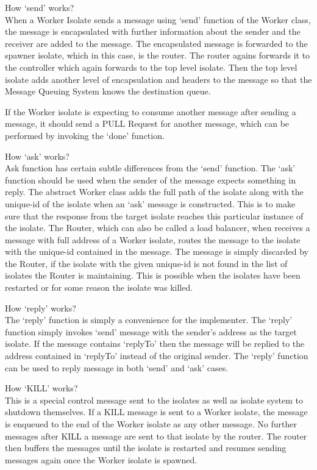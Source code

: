   \begin{description}
    \item How ‘send’ works?\\
      When a Worker Isolate sends a message using ‘send’ function of the Worker class, the message is encapsulated with further information about the sender and the receiver are added to the message. The encapsulated message is forwarded to the spawner isolate, which in this case, is the router. The router agains forwards it to the controller which again forwards to the top level isolate. Then the top level isolate adds another level of encapsulation and headers to the message so that the Message Queuing System knows the destination queue.

      If the Worker isolate is expecting to consume another message after sending a message, it should send a PULL Request for another message, which can be performed by invoking the ‘done’ function.

      \item How ‘ask’ works?\\
    Ask function has certain subtle differences from the ‘send’ function. The ‘ask’ function should be used when the sender of the message expects something in reply. The abstract Worker class adds the full path of the isolate along with the unique-id of the isolate when an ‘ask’ message is constructed. This is to make sure that the response from the target isolate reaches this particular instance of the isolate. The Router, which can also be called a load balancer, when receives a message with full address of a Worker isolate, routes the message to the isolate with the unique-id contained in the message. The message is simply discarded by the Router, if the isolate with the given unique-id is not found in the list of isolates the Router is maintaining. This is possible when the isolates have been restarted or for some reason the isolate was killed.

    \item How ‘reply’ works?\\
    The ‘reply’ function is simply a convenience for the implementer. The ‘reply’ function simply invokes ‘send’ message with the sender’s address as the target isolate. If the message contains ‘replyTo’ then the message will be replied to the address contained in ‘replyTo’ instead of the original sender. The ‘reply’ function can be used to reply message in both \textendash{} ‘send’ and ‘ask’ cases.

    \item How ‘KILL’ works?\\
    This is a special control message sent to the isolates as well as isolate system to shutdown themselves. If a KILL message is sent to a Worker isolate, the message is enqueued to the end of the Worker isolate as any other message. No further messages after KILL a message are sent to that isolate by the router. The router then buffers the messages until the isolate is restarted and resumes sending messages again once the Worker isolate is spawned.


\end{description}

